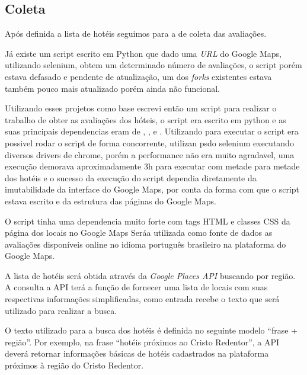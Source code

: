 

\subsection{Coleta}
\label{subsec:coleta}

Após definida a lista de hotéis seguimos para a de coleta das avaliações.

Já existe um script escrito em Python \cite{gaspa93scrapper2023} que dado uma \emph{URL} do Google Maps, utilizando selenium, obtem um determinado número de avaliações, o script porém estava defasado e pendente de atualização, um dos \emph{forks} existentes  estava também pouco mais atualizado porém ainda não funcional.

Utilizando esses projetos como base escrevi então um script para realizar o trabalho de obter as avaliações dos hóteis, o script era escrito em python e as suas principais dependencias eram de \cite{selenium2023}, ,  e . Utilizando  para executar o script era possivel rodar o script de forma concorrente, utilizan psdo selenium executando diversos drivers de chrome, porém a performance não era muito agradavel, uma execução demorava aproximadamente 3h para executar com metade para metade dos hotéis e o sucesso da execução do script dependia diretamente da imutabilidade da interface do Google Maps, por conta da forma com que o script estava escrito e da estrutura das páginas do Google Maps.

O script tinha uma dependencia muito forte com tags HTML e classes CSS da página dos locais no Google Maps
Seráa utilizada como fonte de dados as avaliações disponíveis online no idioma português brasileiro na plataforma do Google Maps.

A lista de hotéis será obtida através da \emph{Google Places API} buscando por região. A consulta a API terá a função de fornecer uma lista de locais com suas respectivas informações simplificadas, como entrada recebe o texto que será utilizado para realizar a busca.

O texto utilizado para a busca dos hotéis é definida no seguinte modelo “frase + região”. Por exemplo, na frase “hotéis próximos ao Cristo Redentor”, a API deverá retornar informações básicas de hotéis cadastrados na plataforma próximos à região do Cristo Redentor.

